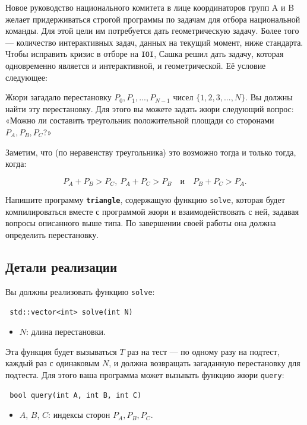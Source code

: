 \documentclass[12pt]{article}
\begin{document}
\renewcommand{\headerLang}{Russian}
\renewcommand{\problemName}{AB23. ТРЕУГОЛЬНИК}

\renewcommand{\headerLeft}{IATI Day 2, Senior group}
\renewcommand{\headerRightFirst}{XVII INTERNATIONAL ADVANCED TOURNAMENT IN INFORMATICS}
\renewcommand{\headerRightSecond}{ONLINE 2026}

\renewcommand{\tl}{$10$ сек.}
\renewcommand{\ml}{$1024$ МБ}
\problem{Задача \problemName}

Новое руководство национального комитета в лице координаторов групп A и B желает придерживаться строгой программы по задачам для отбора национальной команды. Для этой цели им потребуется дать геометрическую задачу. Более того — количество интерактивных задач, данных на текущий момент, ниже стандарта. Чтобы исправить кризис в отборе на \texttt{IOI}, Сашка решил дать задачу, которая одновременно является и интерактивной, и геометрической. Её условие следующее:

Жюри загадало перестановку $P_0,P_1,...,P_{N-1}$ чисел $\{1,2,3,...,N\}$. Вы должны найти эту перестановку. Для этого вы можете задать жюри следующий вопрос: «Можно ли составить треугольник положительной площади со сторонами $P_A,P_B,P_C$?»

Заметим, что (по неравенству треугольника) это возможно тогда и только тогда, когда:

\[P_A + P_B > P_C,\ P_A + P_C > P_B \quad \text{и} \quad P_B + P_C > P_A.\]

Напишите программу \textbf{\texttt{triangle}}, содержащую функцию \texttt{solve}, которая будет компилироваться вместе с программой жюри и взаимодействовать с ней, задавая вопросы описанного выше типа. По завершении своей работы она должна определить перестановку.

\subsection{Детали реализации}
Вы должны реализовать функцию \texttt{solve}:
\begin{lstlisting}
 std::vector<int> solve(int N)
\end{lstlisting}
\begin{itemize}
	\item $N$: длина перестановки.
\end{itemize}

Эта функция будет вызываться $T$ раз на тест — по одному разу на подтест, каждый раз с одинаковым $N$, и должна возвращать загаданную перестановку для подтеста. Для этого ваша программа может вызывать функцию жюри \texttt{query}:
\begin{lstlisting}
 bool query(int A, int B, int C)
\end{lstlisting}
\begin{itemize}
	\item $A$, $B$, $C$: индексы сторон $P_A, P_B, P_C$.
\end{itemize}
\end{document}
